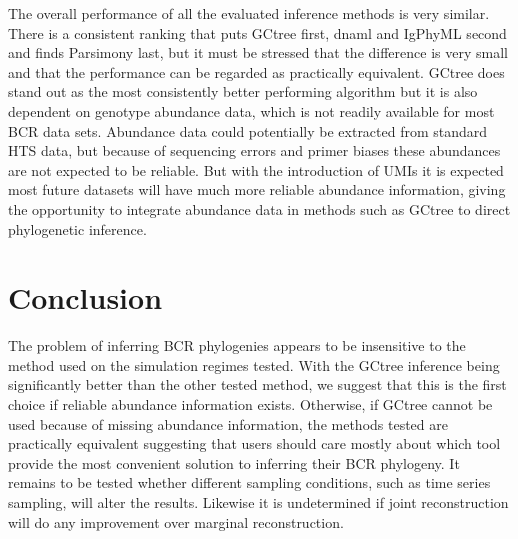 The overall performance of all the evaluated inference methods is very similar.
There is a consistent ranking that puts GCtree first, dnaml and IgPhyML second and finds Parsimony last, but it must be stressed that the difference is very small and that the performance can be regarded as practically equivalent.
GCtree does stand out as the most consistently better performing algorithm but it is also dependent on genotype abundance data, which is not readily available for most BCR data sets.
Abundance data could potentially be extracted from standard HTS data, but because of sequencing errors and primer biases these abundances are not expected to be reliable.
But with the introduction of UMIs it is expected most future datasets will have much more reliable abundance information, giving the opportunity to integrate abundance data in methods such as GCtree to direct phylogenetic inference.




\section{Conclusion}
The problem of inferring BCR phylogenies appears to be insensitive to the method used on the simulation regimes tested.
With the GCtree inference being significantly better than the other tested method, we suggest that this is the first choice if reliable abundance information exists.
Otherwise, if GCtree cannot be used because of missing abundance information, the methods tested are practically equivalent suggesting that users should care mostly about which tool provide the most convenient solution to inferring their BCR phylogeny.
It remains to be tested whether different sampling conditions, such as time series sampling, will alter the results.
Likewise it is undetermined if joint reconstruction will do any improvement over marginal reconstruction.


